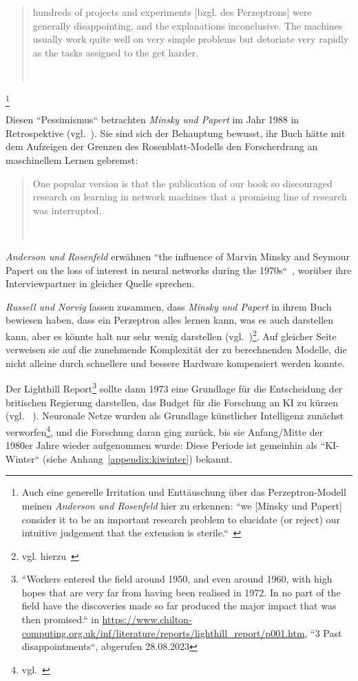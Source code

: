 \blockquote[{~\cite[19]{MP88}}]{
    hundreds of projects and experiments [bzgl. des Perzeptrons] were generally disappointing, and the explanations inconclusive. The machines usually work quite well on very simple problems but detoriate very rapidly as the tasks assigned to the get harder.
}\footnote{
    Auch eine generelle Irritation und Enttäuschung über das Perzeptron-Modell meinen \textit{Anderson und Rosenfeld} hier zu erkennen: ``we [Minsky und Papert] consider it to be an important research problem to elucidate (or reject) our intuitive judgement that the extension is sterile.``~\cite[232]{MP88}
}

\noindent
Diesen ``Pessimismus`` betrachten \textit{Minsky und Papert} im Jahr 1988 in Retrospektive (vgl.~\cite[xiii]{MP88}). Sie sind sich der Behauptung bewusst, ihr Buch hätte mit dem Aufzeigen der Grenzen des Rosenblatt-Modells den Forscherdrang an maschinellem Lernen gebremst:

\blockquote[{~\cite[xii]{MP88}}]{
    One popular version is  that the publication of our book so discouraged research on learning in network machines that a promising line of research was interrupted.
}

\noindent
\textit{Anderson und Rosenfeld} erwähnen ``the influence of Marvin Minsky and Seymour Papert on the loss of interest in neural networks during the 1970s``~\cite[X]{AR98}, worüber ihre Interviewpartner in gleicher Quelle sprechen.

\textit{Russell und Norvig} fassen zusammen, dass \textit{Minsky und Papert} in ihrem Buch bewiesen haben, dass ein Perzeptron alles lernen kann, was es auch darstellen kann, aber es könnte halt nur sehr wenig darstellen (vgl.~\cite[45]{RN09})\footnote{
    vgl. hierzu~\cite[xiii]{MP88}
}.
Auf gleicher Seite verweisen sie auf die zunehmende Komplexität der zu berechnenden Modelle, die nicht alleine durch schnellere und bessere Hardware kompensiert werden konnte.

Der Lighthill Report\footnote{
    ``Workers entered the field around 1950, and even around 1960, with high hopes that are very far from having been realised in 1972. In no part of the field have the discoveries made so far produced the major impact that was then promised.`` in \url{https://www.chilton-computing.org.uk/inf/literature/reports/lighthill\_report/p001.htm}, ``3 Past disappointments``, abgerufen 28.08.2023
} sollte dann 1973 eine Grundlage für die Entscheidung der britischen Regierung darstellen, das Budget für die Forschung an KI zu kürzen (vgl. ~\cite[45]{RN09}). Neuronale Netze wurden als Grundlage künstlicher Intelligenz zunächst verworfen\footnote{
    vgl.~\cite[641]{Ola96}
}, und die Forschung daran ging zurück, bis sie Anfang/Mitte der 1980er Jahre wieder aufgenommen wurde: Diese Periode ist gemeinhin als ``KI-Winter`` (siehe Anhang~\ref{appendix:kiwinter}) bekannt.\\

